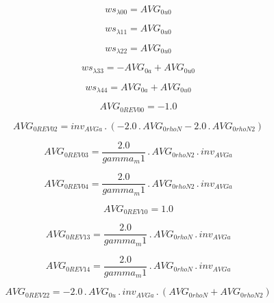 \documentclass{article}
\begin{document}
\begin{dmath}ws_{\lambda 00} = AVG_{0 u0}\end{dmath}

\begin{dmath}ws_{\lambda 11} = AVG_{0 u0}\end{dmath}

\begin{dmath}ws_{\lambda 22} = AVG_{0 u0}\end{dmath}

\begin{dmath}ws_{\lambda 33} = - AVG_{0 a} + AVG_{0 u0}\end{dmath}

\begin{dmath}ws_{\lambda 44} = AVG_{0 a} + AVG_{0 u0}\end{dmath}

\begin{dmath}AVG_{0 REV 00} = -1.0\end{dmath}

\begin{dmath}AVG_{0 REV 02} = inv_{AVG a} \,.\, \left(- 2.0 \,.\, AVG_{0 rhoN} - 2.0 \,.\, AVG_{0 rhoN2}\right)\end{dmath}

\begin{dmath}AVG_{0 REV 03} = \frac{2.0}{gamma_m1} \,.\, AVG_{0 rhoN2} \,.\, inv_{AVG a}\end{dmath}

\begin{dmath}AVG_{0 REV 04} = \frac{2.0}{gamma_m1} \,.\, AVG_{0 rhoN2} \,.\, inv_{AVG a}\end{dmath}

\begin{dmath}AVG_{0 REV 10} = 1.0\end{dmath}

\begin{dmath}AVG_{0 REV 13} = \frac{2.0}{gamma_m1} \,.\, AVG_{0 rhoN} \,.\, inv_{AVG a}\end{dmath}

\begin{dmath}AVG_{0 REV 14} = \frac{2.0}{gamma_m1} \,.\, AVG_{0 rhoN} \,.\, inv_{AVG a}\end{dmath}

\begin{dmath}AVG_{0 REV 22} = - 2.0 \,.\, AVG_{0 u} \,.\, inv_{AVG a} \,.\, \left(AVG_{0 rhoN} + AVG_{0 rhoN2}\right)\end{dmath}
\end{document}

